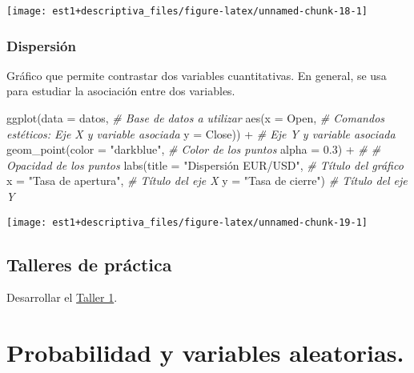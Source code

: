 \documentclass[
]{book}
\newenvironment{Shaded}{\begin{snugshade}}{\end{snugshade}}
\newcommand{\AttributeTok}[1]{\textcolor[rgb]{0.77,0.63,0.00}{#1}}
\newcommand{\CommentTok}[1]{\textcolor[rgb]{0.56,0.35,0.01}{\textit{#1}}}
\newcommand{\FloatTok}[1]{\textcolor[rgb]{0.00,0.00,0.81}{#1}}
\newcommand{\FunctionTok}[1]{\textcolor[rgb]{0.00,0.00,0.00}{#1}}
\newcommand{\NormalTok}[1]{#1}
\newcommand{\SpecialCharTok}[1]{\textcolor[rgb]{0.00,0.00,0.00}{#1}}
\newcommand{\StringTok}[1]{\textcolor[rgb]{0.31,0.60,0.02}{#1}}
\begin{document}
\begin{center}\texttt{[image: est1+descriptiva\_files/figure-latex/unnamed-chunk-18-1]} \end{center}

\hypertarget{dispersiuxf3n}{%
\subsection{Dispersión}\label{dispersiuxf3n}}

Gráfico que permite contrastar dos variables cuantitativas. En general, se usa para estudiar la asociación entre dos variables.

\begin{Shaded}
\begin{Highlighting}[]
\FunctionTok{ggplot}\NormalTok{(}\AttributeTok{data =}\NormalTok{ datos, }\CommentTok{\# Base de datos a utilizar}
       \FunctionTok{aes}\NormalTok{(}\AttributeTok{x =}\NormalTok{ Open, }\CommentTok{\# Comandos estéticos: Eje X y variable asociada}
           \AttributeTok{y =}\NormalTok{ Close)) }\SpecialCharTok{+}  \CommentTok{\# Eje Y y variable asociada}
  \FunctionTok{geom\_point}\NormalTok{(}\AttributeTok{color =} \StringTok{"darkblue"}\NormalTok{, }\CommentTok{\# Color de los puntos}
             \AttributeTok{alpha =} \FloatTok{0.3}\NormalTok{) }\SpecialCharTok{+} \CommentTok{\# \# Opacidad de los puntos}
  \FunctionTok{labs}\NormalTok{(}\AttributeTok{title =} \StringTok{"Dispersión EUR/USD"}\NormalTok{, }\CommentTok{\# Título del gráfico}
       \AttributeTok{x =} \StringTok{"Tasa de apertura"}\NormalTok{, }\CommentTok{\# Título del eje X}
       \AttributeTok{y =} \StringTok{"Tasa de cierre"}\NormalTok{) }\CommentTok{\# Título del eje Y}
\end{Highlighting}
\end{Shaded}

\begin{center}\texttt{[image: est1+descriptiva\_files/figure-latex/unnamed-chunk-19-1]} \end{center}

\hypertarget{talleres-de-pruxe1ctica}{%
\section{Talleres de práctica}\label{talleres-de-pruxe1ctica}}

Desarrollar el \href{https://colab.research.google.com/drive/1wASaDklH5qgHqfCPdri-V2cg00KflJBf?usp=sharing}{Taller 1}.

\hypertarget{probabilidad-y-variables-aleatorias.}{%
\chapter{Probabilidad y variables aleatorias.}\label{probabilidad-y-variables-aleatorias.}}
\end{document}
